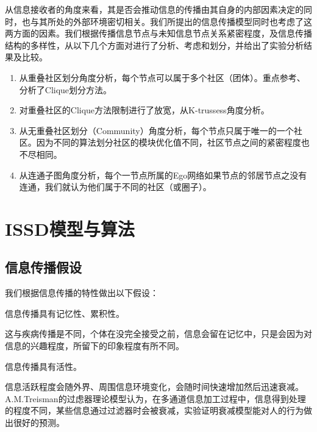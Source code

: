 从信息接收者的角度来看，其是否会推动信息的传播由其自身的内部因素决定的同时，也与其所处的外部环境密切相关。我们所提出的信息传播模型同时也考虑了这两方面的因素。我们根据传播信息节点与未知信息节点关系紧密程度，及信息传播结构的多样性，从以下几个方面对进行了分析、考虑和划分，并给出了实验分析结果及比较。
\begin{enumerate}[(1)]
	\item 从重叠社区划分角度分析，每个节点可以属于多个社区（团体）。重点参考、分析了Clique划分方法\cite{palla2005uncovering}。
	\item 对重叠社区的Clique方法限制进行了放宽，从K-trussess角度分析\cite{cohen2008trusses,csermely2013structure,redmond2012mining,huang2014querying,rossi2014fast}。
	\item 从无重叠社区划分（Community）\cite{newman2004finding}角度分析，每个节点只属于唯一的一个社区。因为不同的算法划分社区的模块优化值不同，社区节点之间的紧密程度也不尽相同。
	\item 从连通子图角度分析，每个一节点所属的Ego网络如果节点的邻居节点之没有连通，我们就认为他们属于不同的社区（或圈子）。
\end{enumerate}


\section{ISSD模型与算法}
\subsection{信息传播假设}
我们根据信息传播的特性做出以下假设：
\begin{assumption}
\label{chap5:assumption1}
	信息传播具有记忆性、累积性。
\end{assumption}

这与疾病传播是不同，个体在没完全接受之前，信息会留在记忆中，只是会因为对信息的兴趣程度，所留下的印象程度有所不同。

\begin{assumption}
\label{chap5:assumption2}
	信息传播具有活性。%
\end{assumption}

信息活跃程度会随外界、周围信息环境变化，会随时间快速增加然后迅速衰减。A.M.Treisman\cite{treisman1980feature}的过虑器理论模型认为，在多通道信息加工过程中，信息得到处理的程度不同，某些信息通过过滤器时会被衰减，实验证明衰减模型能对人的行为做出很好的预测。

